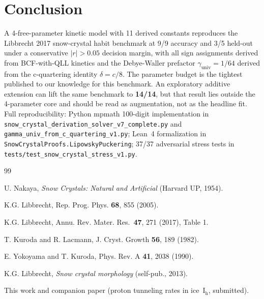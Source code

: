 \documentclass[aps,prb,reprint,superscriptaddress]{revtex4-2}
\begin{document}
\section{Conclusion}

A 4-free-parameter kinetic model with 11 derived constants reproduces
the Libbrecht 2017 snow-crystal habit benchmark at 9/9 accuracy and
3/5 held-out under a conservative $|r|>0.05$ decision margin, with all
sign assignments derived from BCF-with-QLL
kinetics and the Debye-Waller prefactor $\gamma_\text{univ} = 1/64$
derived from the c-quartering identity $\delta = c/8$.  The parameter
budget is the tightest published to our knowledge for this benchmark.
An exploratory additive extension can lift the same benchmark to
\textbf{14/14}, but that result lies outside the 4-parameter core and
should be read as augmentation, not as the headline fit.
Full reproducibility: Python mpmath 100-digit implementation in
\texttt{snow\_crystal\_derivation\_solver\_v7\_complete.py} and
\texttt{gamma\_univ\_from\_c\_quartering\_v1.py}; Lean~4 formalization
in \texttt{SnowCrystalProofs.LipowskyPuckering}; 37/37 adversarial
stress tests in \texttt{tests/test\_snow\_crystal\_stress\_v1.py}.

\begin{thebibliography}{99}

 U. Nakaya, \textit{Snow Crystals: Natural and
    Artificial} (Harvard UP, 1954).

 K.G. Libbrecht, Rep. Prog. Phys. \textbf{68},
    855 (2005).

 K.G. Libbrecht, Annu. Rev. Mater. Res.\
    \textbf{47}, 271 (2017), Table 1.

 T. Kuroda and R. Lacmann, J. Cryst. Growth
    \textbf{56}, 189 (1982).

 E. Yokoyama and T. Kuroda, Phys. Rev. A
    \textbf{41}, 2038 (1990).

 K.G. Libbrecht, \textit{Snow crystal
    morphology} (self-pub., 2013).

 This work and companion paper (proton
    tunneling rates in ice~I$_\text{h}$, submitted).

\end{thebibliography}
\end{document}

